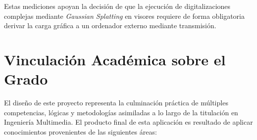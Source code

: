Estas mediciones apoyan la decisión de que la ejecución de digitalizaciones complejas mediante \textit{Gaussian Splatting} en visores requiere de forma obligatoria derivar la carga gráfica a un ordenador externo mediante transmisión.




































\section{Vinculación Académica sobre el Grado}
El diseño de este proyecto representa la culminación práctica de múltiples competencias, lógicas y metodologías asimiladas a lo largo de la titulación en Ingeniería Multimedia. El producto final de esta aplicación es resultado de aplicar conocimientos provenientes de las siguientes áreas:

